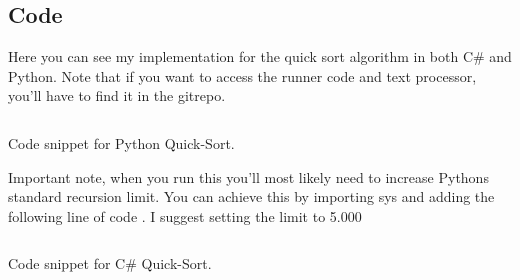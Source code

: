 \subsection{Code}\label{comp_code}

Here you can see my implementation for the quick sort algorithm in both C\# and Python. Note that if you want to access the runner code and text processor, you'll have to find it in the gitrepo.

\begin{listing}[H]
    \inputminted{python}{src/code/quick_sort.py}
    \caption{\label{snip:python-quicksort}Code snippet for Python Quick-Sort.}
\end{listing}


\noindent Important note, when you run this you'll most likely need to increase Pythons standard recursion limit. You can achieve this by importing sys and adding the following line of code . I suggest setting the limit to 5.000 

\begin{listing}[H]
    \inputminted{c}{src/code/quick_sort.cs}
    \caption{\label{snip:csharp-quicksort}Code snippet for C\# Quick-Sort.}
\end{listing}
